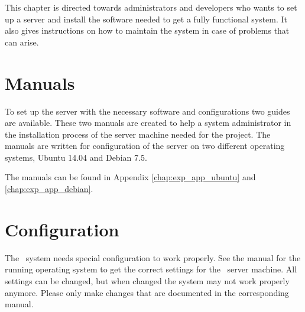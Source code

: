 This chapter is directed towards administrators and developers who wants to
set up a server and install the software needed to get a fully functional system.
It also gives instructions on how to maintain the system in case of problems
that can arise.
\section{Manuals}
To set up the server with the necessary software and configurations two guides are available. These two manuals are created to help a system administrator in the installation process of the server machine needed for the project. The manuals are written for configuration of the server on two different operating systems, Ubuntu 14.04 and Debian 7.5. 

The manuals can be found in Appendix \ref{chap:exp_app_ubuntu} and \ref{chap:exp_app_debian}.

\section{Configuration}
The \appName\ system needs special configuration to work properly. See the manual for the running operating system to get the correct settings for the \appName\ server machine. All settings can be changed, but when changed the system may not work properly anymore. Please only make changes that are documented in the corresponding manual.